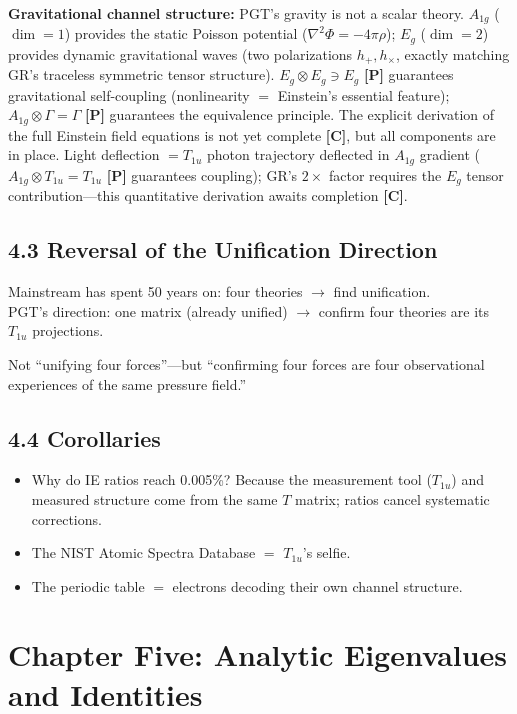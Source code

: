\documentclass[11pt,a4paper]{article}
\newcommand{\gradeP}{\textbf{[P]}}
\newcommand{\gradeC}{\textbf{[C]}}
\begin{document}
\textbf{Gravitational channel structure:} PGT's gravity is not a scalar theory. $A_{1g}$ ($\dim=1$) provides the static Poisson potential ($\nabla^2\Phi=-4\pi\rho$); $E_g$ ($\dim=2$) provides dynamic gravitational waves (two polarizations $h_+, h_\times$, exactly matching GR's traceless symmetric tensor structure). $E_g\otimes E_g\ni E_g$ \gradeP{} guarantees gravitational self-coupling (nonlinearity $=$ Einstein's essential feature); $A_{1g}\otimes\Gamma=\Gamma$ \gradeP{} guarantees the equivalence principle. The explicit derivation of the full Einstein field equations is not yet complete \gradeC, but all components are in place. Light deflection $= T_{1u}$ photon trajectory deflected in $A_{1g}$ gradient ($A_{1g}\otimes T_{1u}=T_{1u}$ \gradeP{} guarantees coupling); GR's $2\times$ factor requires the $E_g$ tensor contribution---this quantitative derivation awaits completion \gradeC.

\subsection{4.3 Reversal of the Unification Direction}

Mainstream has spent 50 years on: four theories $\to$ find unification.\\
PGT's direction: one matrix (already unified) $\to$ confirm four theories are its $T_{1u}$ projections.

Not ``unifying four forces''---but ``confirming four forces are four observational experiences of the same pressure field.''

\subsection{4.4 Corollaries}

\begin{itemize}[nosep]
\item Why do IE ratios reach 0.005\%? Because the measurement tool ($T_{1u}$) and measured structure come from the same $T$ matrix; ratios cancel systematic corrections.
\item The NIST Atomic Spectra Database $=$ $T_{1u}$'s selfie.
\item The periodic table $=$ electrons decoding their own channel structure.
\end{itemize}

\section{Chapter Five: Analytic Eigenvalues and Identities}\label{sec:ch5}
\end{document}

